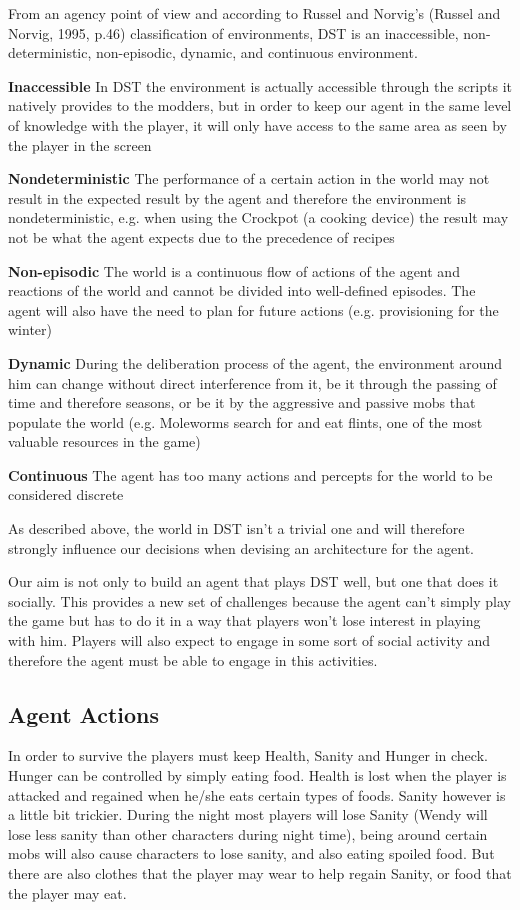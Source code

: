 From an agency point of view and according to Russel and Norvig’s (Russel and Norvig, 1995, p.46) classification of environments, DST is an inaccessible, non-deterministic, non-episodic, dynamic, and continuous environment.

\begin{description}
	\item \textbf{Inaccessible} In DST the environment is actually accessible through the scripts it natively provides to the modders, but in order to keep our agent in the same level of knowledge with the player, it will only have access to the same area as seen by the player in the screen
	\item \textbf{Nondeterministic} The performance of a certain action in the world may not result in the expected result by the agent and therefore the environment is nondeterministic, e.g. when using the Crockpot (a cooking device) the result may not be what the agent expects due to the precedence of recipes
	\item \textbf{Non-episodic} The world is a continuous flow of actions of the agent and reactions of the world and cannot be divided into well-defined episodes. 
The agent will also have the need to plan for future actions (e.g. provisioning for the winter)
	\item \textbf{Dynamic} During the deliberation process of the agent, the environment around him can change without direct interference from it, be it through the passing of time and therefore seasons, or be it by the aggressive and passive mobs that populate the world (e.g. Moleworms search for and eat flints, one of the most valuable resources in the game)
	\item \textbf{Continuous} The agent has too many actions and percepts for the world to be considered discrete
\end{description}

As described above, the world in DST isn’t a trivial one and will therefore strongly influence our decisions when devising an architecture for the agent.

Our aim is not only to build an agent that plays DST well, but one that does it socially.
This provides a new set of challenges because the agent can’t simply play the game but has to do it in a way that players won’t lose interest in playing with him.
Players will also expect to engage in some sort of social activity and therefore the agent must be able to engage in this activities.

\subsection*{Agent Actions}
In order to survive the players must keep Health, Sanity and Hunger in check.
Hunger can be controlled by simply eating food.
Health is lost when the player is attacked and regained when he/she eats certain types of foods.
Sanity however is a little bit trickier.
During the night most players will lose Sanity (Wendy will lose less sanity than other characters during night time), being around certain mobs will also cause characters to lose sanity, and also eating spoiled food.
But there are also clothes that the player may wear to help regain Sanity, or food that the player may eat.

